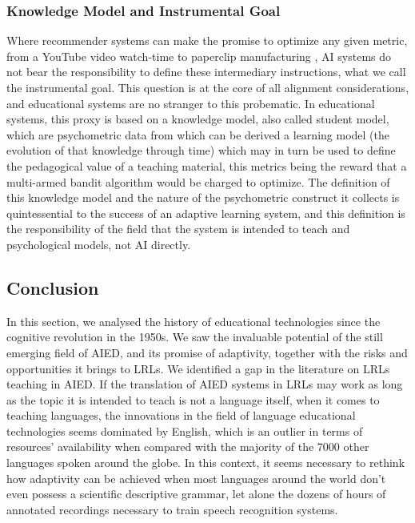         \subsubsection{Knowledge Model and Instrumental Goal}
Where recommender systems can make the promise to optimize any given metric, from a YouTube video watch-time to paperclip manufacturing \parencite{bostrom_ethical_2003}, AI systems do not bear the responsibility to define these intermediary instructions, what we call the instrumental goal. This question is at the core of all alignment considerations, and educational systems are no stranger to this probematic. In educational systems, this proxy is based on a knowledge model, also called student model, which are psychometric data from which can be derived a learning model (the evolution of that knowledge through time) which may in turn be used to define the pedagogical value of a teaching material, this metrics being the reward that a multi-armed bandit algorithm would be charged to optimize. The definition of this knowledge model and the nature of the psychometric construct it collects is quintessential to the success of an adaptive learning system, and this definition is the responsibility of the field that the system is intended to teach and psychological models, not AI directly.

    \subsection{Conclusion}
In this section, we analysed the history of educational technologies since the cognitive revolution in the 1950s. We saw the invaluable potential of the still emerging field of AIED, and its promise of adaptivity, together with the risks and opportunities it brings to LRLs. We identified a gap in the literature on LRLs teaching in AIED. If the translation of AIED systems in LRLs may work as long as the topic it is intended to teach is not a language itself, when it comes to teaching languages, the innovations in the field of language educational technologies seems dominated by English, which is an outlier in terms of resources' availability when compared with the majority of the 7000 other languages spoken around the globe. In this context, it seems necessary to rethink how adaptivity can be achieved when most languages around the world don't even possess a scientific descriptive grammar, let alone the dozens of hours of annotated recordings necessary to train speech recognition systems.

